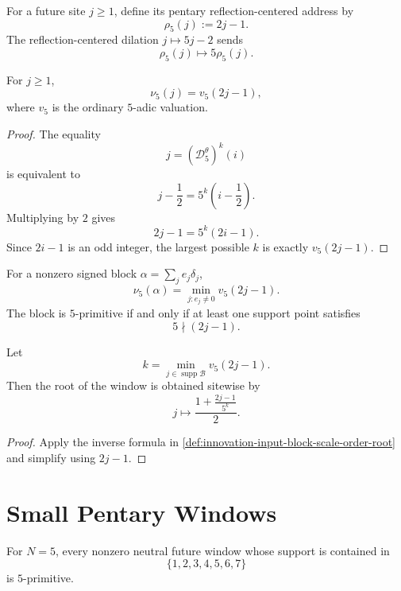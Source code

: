 \begin{definition}
\label{def:innovation-input-pentary-reflection-centered-address}
For a future site $j\ge1$, define its pentary reflection-centered address
by
$$
\rho_5(j):=2j-1.
$$
The reflection-centered dilation $j\mapsto5j-2$ sends
$$
\rho_5(j)\mapsto5\rho_5(j).
$$
\end{definition}

\begin{theorem}
\label{thm:innovation-input-pentary-site-scale-order}
For $j\ge1$,
$$
\nu_5(j)=v_5(2j-1),
$$
where $v_5$ is the ordinary $5$-adic valuation.
\end{theorem}

\begin{proof}
The equality
$$
j=(\mathcal D_5^\theta)^k(i)
$$
is equivalent to
$$
j-\frac12=5^k\left(i-\frac12\right).
$$
Multiplying by $2$ gives
$$
2j-1=5^k(2i-1).
$$
Since $2i-1$ is an odd integer, the largest possible $k$ is exactly
$v_5(2j-1)$.
\end{proof}

\begin{corollary}
\label{cor:innovation-input-pentary-block-scale-order}
For a nonzero signed block $\alpha=\sum_j e_j\delta_j$,
$$
\nu_5(\alpha)
=
\min_{j:e_j\ne0}v_5(2j-1).
$$
The block is $5$-primitive if and only if at least one support point
satisfies
$$
5\nmid(2j-1).
$$
\end{corollary}

\begin{corollary}
\label{cor:innovation-input-pentary-window-root-formula}
Let
$$
k=\min_{j\in\operatorname{supp}\mathcal B}v_5(2j-1).
$$
Then the root of the window is obtained sitewise by
$$
j\mapsto
\frac{1+\frac{2j-1}{5^k}}2.
$$
\end{corollary}

\begin{proof}
Apply the inverse formula in
\autoref{def:innovation-input-block-scale-order-root} and simplify using
$2j-1$.
\end{proof}

\section{Small Pentary Windows}
\label{sec:innovation-input-small-pentary-windows}

\begin{proposition}
\label{prop:innovation-input-small-pentary-windows-primitive}
For $N=5$, every nonzero neutral future window whose support is contained
in
$$
\{1,2,3,4,5,6,7\}
$$
is $5$-primitive.
\end{proposition}

